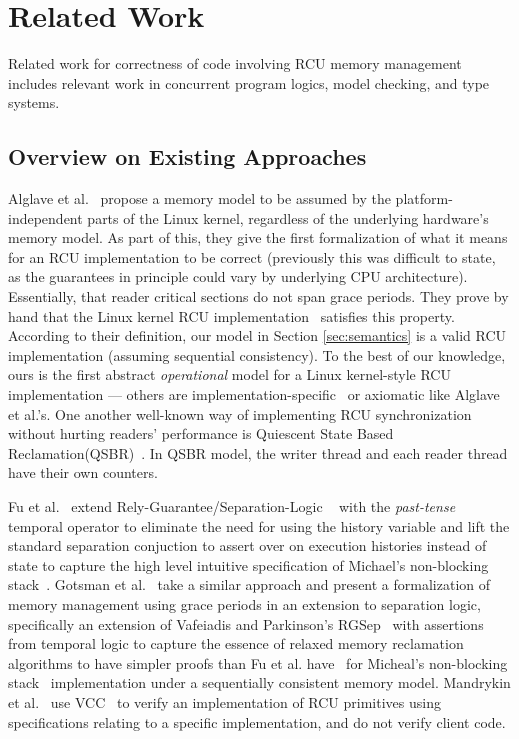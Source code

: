 \section{Related Work}
\label{sec:relatedwork}
Related work for correctness of code involving RCU memory management includes relevant work in concurrent program logics, model checking, and type systems.
\subsection{Overview on Existing Approaches}
Alglave et al.~\cite{Alglave:2018:FSC:3173162.3177156} propose a memory model to be assumed by the platform-independent parts of the Linux kernel, regardless of the underlying hardware's memory model.
As part of this, they give the first formalization of what it means for an RCU implementation to be correct (previously this was difficult to state, as the guarantees in principle could vary by underlying CPU architecture). Essentially, that reader critical sections do not span grace periods.  They prove by hand that the Linux kernel RCU implementation~\cite{DBLP:conf/cav/AlglaveKT13,abssem} satisfies this property. 
According to their definition, our model in Section \ref{sec:semantics} is a valid RCU implementation (assuming sequential consistency).
To the best of our knowledge, ours is the first abstract \emph{operational} model for a Linux kernel-style RCU implementation --- others are implementation-specific~\cite{Mandrykin:2016:TDV:3001219.3001297} or axiomatic like Alglave et al.'s. One another well-known way of implementing RCU synchronization without hurting readers' performance is \textsf{Quiescent State Based Reclamation}(QSBR)~\cite{urcu_ieee}. In QSBR model, the writer thread and each reader thread have their own counters. 

 Fu et al.~\cite{shao_temp} extend Rely-Guarantee/Separation-Logic ~\cite{vafeiadis07,Feng:2007:RCS:1762174.1762193,Feng:2009:LRR:1480881.1480922} with the \textit{past-tense} temporal operator to eliminate the need for using the history variable and lift the standard separation conjuction to assert over on execution histories instead of state to capture the high level intuitive specification of Michael's non-blocking stack~\cite{Michael:2004:HPS:987524.987595}. Gotsman et al.~\cite{Gotsman:2013:VCM:2450268.2450289} take a similar approach and present a formalization of memory management using grace periods in an extension to separation logic, specifically an extension of Vafeiadis and Parkinson's \textsf{RGSep}~\cite{vafeiadis07} with assertions from temporal logic to capture the essence of relaxed memory reclamation algorithms to have simpler proofs than Fu et al. have~\cite{shao_temp} for Micheal's non-blocking stack~\cite{Michael:2004:HPS:987524.987595} implementation under a sequentially consistent memory model. Mandrykin et al.~\cite{Mandrykin:2016:TDV:3001219.3001297} use \textsf{VCC}~\cite{Cohen:2009:VPS:1616077.1616080} to verify an implementation of RCU primitives using specifications relating to a specific implementation, and do not verify client code.

